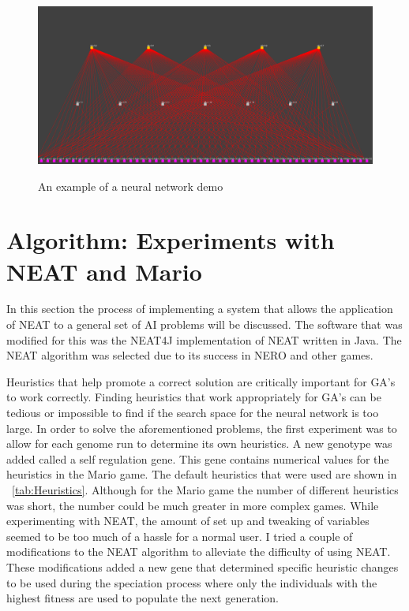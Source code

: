 \documentclass[12pt]{ucthesis} \newif\ifpdf \ifx\pdfoutput\undefined
\begin{document}
\begin{figure}[h!]
  \caption{An example of a neural network demo}
  \centering
    \includegraphics[width=1\textwidth]{simplemarionet.png}
   \label{fig:simplemarionet} 
\end{figure}


\chapter{Algorithm: Experiments with NEAT and Mario}


In this section the process of implementing a system that allows the
application of NEAT to a general set of AI problems will be discussed. The
software that was modified for this was the NEAT4J implementation of NEAT
written in Java. The NEAT algorithm was selected due to its success in NERO and
other games.

Heuristics that help promote a correct solution are critically important for
GA’s to work correctly. Finding heuristics that work appropriately for GA’s can be
tedious or impossible to find if the search space for the neural network is too
large.
In order to solve the aforementioned problems, the first experiment was to allow
for each genome run to determine its own heuristics. A new genotype was added
called a self regulation gene. This gene contains numerical values for the
heuristics in the Mario game. The default heuristics that were used are shown in
~\ref{tab:Heuristics}. Although for the Mario game the number of different
heuristics was short, the number could be much greater in more complex games.
While experimenting with NEAT, the amount of set up and tweaking of variables seemed to be too much of a hassle
for a normal user.  I tried a couple of modifications to the NEAT algorithm to
alleviate the difficulty of using NEAT.  These modifications added a new gene that determined specific heuristic changes to be used during the speciation
process where only the individuals with the highest fitness are used to populate
the next generation.
\end{document}
